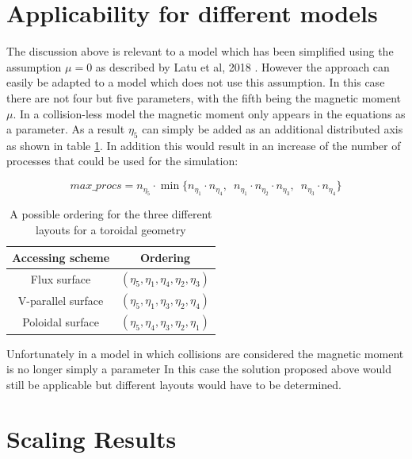 \section{Applicability for different models}

The discussion above is relevant to a model which has been simplified using the assumption $\mu=0$ as described by Latu et al, 2018 \cite{YamanPaper}. However the approach can easily be adapted to a model which does not use this assumption. In this case there are not four but five parameters, with the fifth being the magnetic moment $\mu$. In a collision-less model the magnetic moment only appears in the equations as a parameter. As a result $\eta_5$ can simply be added as an additional distributed axis as shown in table \ref{tab::Toroidal Ordering}. In addition this would result in an increase of the number of processes that could be used for the simulation:

$$max\_procs = n_{\eta_5} \cdot \min\{n_{\eta_1}\!\!\cdot n_{\eta_4},\, \, \, n_{\eta_1}\!\!\cdot n_{\eta_2}\!\! \cdot n_{\eta_3},\, \, \, n_{\eta_3}\!\!\cdot n_{\eta_4}\}$$

\begin{table}[ht]
\begin{center}
 \begin{tabular}{|c|c|}
  \hline
  Accessing scheme & Ordering\\
  \hline
  Flux surface & $(\eta_5, \eta_1,\eta_4,\eta_2,\eta_3)$\\
  \hline
  V-parallel surface & $(\eta_5, \eta_1,\eta_3,\eta_2,\eta_4)$\\
  \hline
  Poloidal surface & $(\eta_5, \eta_4,\eta_3,\eta_2,\eta_1)$\\
  \hline
 \end{tabular}
 \caption{\label{tab::Toroidal Ordering} A possible ordering for the three different layouts for a toroidal geometry}
\end{center}
\end{table}

Unfortunately in a model in which collisions are considered the magnetic moment is no longer simply a parameter
In this case the solution proposed above would still be applicable but different layouts would have to be determined.

\section{Scaling Results}


